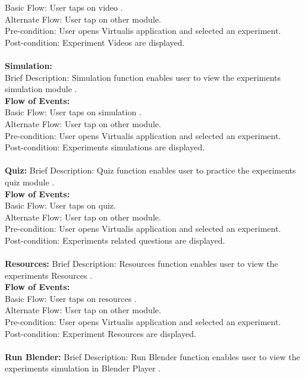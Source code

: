 \documentclass[12pt]{report}
\begin{document}
\indent	 Basic Flow: User taps on video . \\
\indent	Alternate Flow: User  tap on other module. \\
Pre-condition: User opens Virtualis application and selected an experiment.\\ 
Post-condition: Experiment Videos are displayed. 
\\
\\
\textbf{Simulation: }\\
Brief Description: Simulation function enables user to view the experiments simulation module . \\
\textbf{Flow of Events: } \\
\indent	 Basic Flow: User taps on simulation . \\
\indent	Alternate Flow: User  tap on other module. \\
Pre-condition: User opens Virtualis application and selected an experiment. \\
Post-condition: Experiments simulations are displayed. 
\\
\\
\textbf{Quiz: }
Brief Description: Quiz function enables user to practice the experiments quiz module . \\
\textbf{Flow of Events: }\\
\indent	 Basic Flow: User taps on quiz. \\
\indent	Alternate Flow: User  tap on other module. \\
Pre-condition: User opens Virtualis application and selected an experiment. \\
Post-condition: Experiments related questions are displayed. 
\\
\\
\textbf{Resources: }
Brief Description: Resources function enables user to view the experiments Resources . \\
\textbf{Flow of Events: }\\
\indent	 Basic Flow: User taps on resources . \\
\indent	Alternate Flow: User  tap on other module. \\
Pre-condition: User opens Virtualis application and selected an experiment. \\
Post-condition: Experiment Resources are displayed. 
\\
\\
\textbf{Run Blender: }
Brief Description: Run Blender  function enables user to  view the experiments simulation in Blender Player . \\
\end{document}
